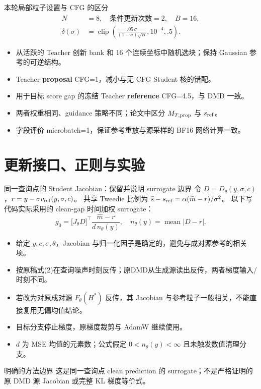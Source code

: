 \documentclass[10pt,aspectratio=169]{beamer}
\begin{document}
\begin{frame}{本轮局部粒子设置与 CFG 的区分}
\small
\begin{align}
N&=8,\quad \text{条件更新次数}=2,\quad B=16,\\
\delta(\sigma)&=\operatorname{clip}\!\left(
\frac{.05\,\sigma}{(1-\sigma)\sqrt B},10^{-4},.5\right).
\end{align}
\begin{itemize}\itemsep5pt
\item 从活跃的 Teacher 创新 bank 和 16 个连续坐标中随机选块；保持 Gaussian 参考的可逆结构。
\item Teacher \textbf{proposal} CFG=1，减小与无 CFG Student 核的错配。
\item 用于目标 score gap 的冻结 Teacher \textbf{reference} CFG=4.5，与 DMD 一致。
\item 两者权重相同、guidance 策略不同；论文中区分 $M_{T,\rm prop}$ 与 $s_{\rm ref}$。
\item 字段评价 microbatch=1，保证参考重放与源采样的 BF16 网络计算一致。
\end{itemize}
\end{frame}

\section{更新接口、正则与实验}
\begin{frame}{同一查询点的 Student Jacobian：保留并说明 surrogate 边界}
\small
令 $D=D_\theta(y,\sigma,c)$，$r=y-\sigma v_{\rm ref}(y,\sigma,c)$。
共享 Tweedie 比例为 $\widehat s-s_{\rm ref}=\alpha(\widehat m-r)/\sigma^2$。
以下写代码实际采用的 clean-gap 时间加权 surrogate：
\begin{equation}
g_0=\big[J_\theta D\big]^\top\frac{\widehat m-r}{d\,n_\theta(y)},\quad
n_\theta(y)=\operatorname{mean}|D-r|.
\end{equation}
\begin{itemize}\itemsep5pt
\item 给定 $y,c,\sigma,\theta$，Jacobian 与归一化因子是确定的，避免与成对源参考的相关项。
\item 按原稿式(2)在查询噪声时刻反传；原DMD从生成源读出反传，两者梯度输入/时刻不同。
\item 若改为对原成对源 $F_\theta(H^*)$ 反传，其 Jacobian 与参考粒子一般相关，不能直接复用无偏均值结论。
\item 目标分支停止梯度，原梯度裁剪与 AdamW 继续使用。
\item $d$ 为 MSE 均值的元素数；公式假定 $0<n_\theta(y)<\infty$ 且未触发数值清理分支。
\end{itemize}
\begin{alertblock}{明确的方法边界}
这是同一查询点 clean prediction 的 surrogate；不是严格证明的原 DMD 源 Jacobian 或完整 KL 梯度等价式。
\end{alertblock}
\end{frame}
\end{document}
